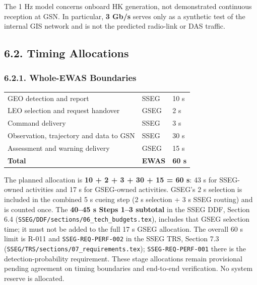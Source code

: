 The 1 Hz model concerns onboard HK generation, not demonstrated continuous reception at GSN. In particular, \textbf{3 Gb/\allowbreak{}s} serves only as a synthetic test of the internal GIS network and is not the predicted radio-link or DAS traffic.

\subsection{6.2. Timing Allocations}\label{timing-allocations}

\subsubsection{6.2.1. Whole-EWAS Boundaries}\label{system-boundaries}

\begingroup{}
\begin{longtable}{|P{0.62}|P{0.20}|P{0.18}|}
\hline{}
 &  & \\ \hline
\endhead
\hline\endlastfoot
GEO detection and report & SSEG & 10 s\\ \hline
LEO selection and request handover & GSEG & 2 s\\ \hline
Command delivery & SSEG & 3 s\\ \hline
Observation, trajectory and data to GSN & SSEG & 30 s\\ \hline
Assessment and warning delivery & GSEG & 15 s\\ \hline
\textbf{Total} & \textbf{EWAS} & \textbf{60 s}\\*
\end{longtable}
\endgroup

The planned allocation is \textbf{10 + 2 + 3 + 30 + 15 = 60 s}: 43 s for SSEG-owned activities and 17 s for GSEG-owned activities. GSEG's 2 s selection is included in the combined 5 s cueing step (2 s selection + 3 s SSEG routing) and is counted once. The \textbf{40--45 s Steps 1--3 subtotal} in the SSEG DDF, Section 6.4 (\texttt{SSEG/DDF/sections/06\_tech\_budgets.tex}), includes that GSEG selection time; it must not be added to the full 17 s GSEG allocation. The overall 60 s limit is R-011 and \texttt{SSEG-REQ-PERF-002} in the SSEG TRS, Section 7.3 (\texttt{SSEG/TRS/sections/07\_requirements.tex}); \texttt{SSEG-REQ-PERF-001} there is the detection-probability requirement. These stage allocations remain provisional pending agreement on timing boundaries and end-to-end verification. No system reserve is allocated.

